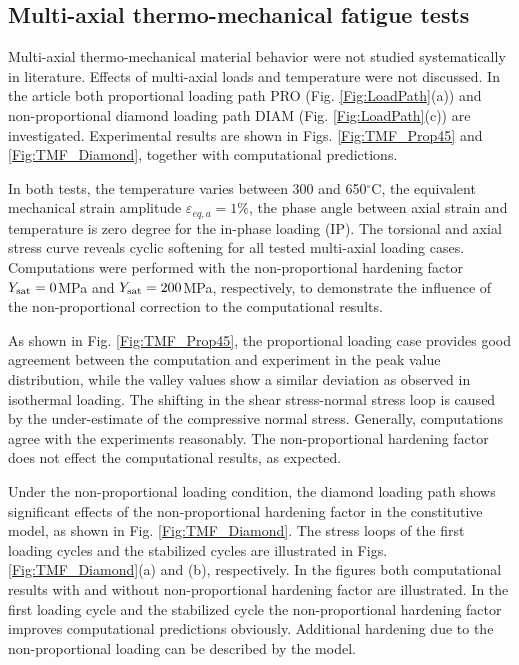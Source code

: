 \subsection{Multi-axial thermo-mechanical fatigue tests}
\noindent
Multi-axial thermo-mechanical material behavior were not studied systematically in literature. Effects of multi-axial loads and temperature were not discussed. In the article both proportional loading path PRO (Fig. \ref{Fig:LoadPath}(a)) and non-proportional diamond loading path DIAM (Fig. \ref{Fig:LoadPath}(c)) are investigated. Experimental results are shown in Figs. \ref{Fig:TMF_Prop45} and \ref{Fig:TMF_Diamond}, together with computational predictions.

In both tests, the temperature varies between 300 and 650$^{\circ}$C, the equivalent mechanical strain amplitude $\varepsilon_{eq,a}=1\%$, the phase angle between axial strain and temperature is zero degree for the in-phase loading (IP).
The torsional and axial stress curve reveals cyclic softening for all tested multi-axial loading cases.
Computations were performed with the non-proportional hardening factor $Y_{\rm sat}=0$MPa and $Y_{\rm sat}=200$MPa, respectively, to demonstrate the influence of the non-proportional correction to the computational results.

As shown in Fig. \ref{Fig:TMF_Prop45}, the proportional loading case provides good agreement between the computation and experiment in the peak value distribution, while the valley values show a similar deviation as observed in isothermal loading. The shifting in the shear stress-normal stress loop is caused by the under-estimate of the compressive normal stress. Generally, computations agree with the experiments reasonably. The non-proportional hardening factor does not effect the computational results, as expected.

Under the non-proportional loading condition, the diamond loading path shows significant effects of the non-proportional hardening factor  in the constitutive model, as shown in Fig. \ref{Fig:TMF_Diamond}. The stress loops of the first loading cycles and the stabilized cycles are illustrated in Figs. \ref{Fig:TMF_Diamond}(a) and (b), respectively. In the figures both computational results with and without non-proportional hardening factor are illustrated. In the first loading cycle and the stabilized cycle the non-proportional hardening factor improves computational predictions obviously. Additional hardening due to the non-proportional loading can be described by the model.

